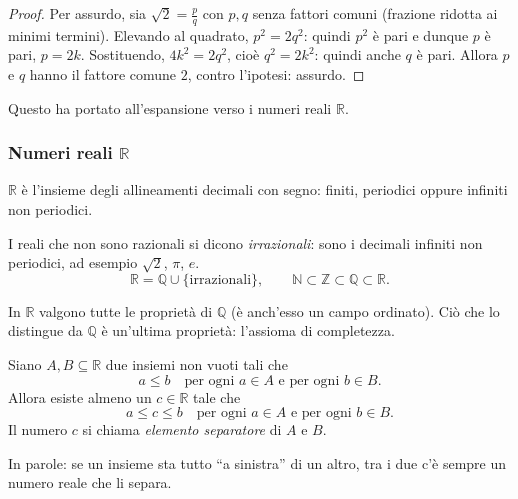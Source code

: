 \documentclass[11pt,a4paper]{article}
\begin{document}
\begin{proof}
Per assurdo, sia $\sqrt{2} = \frac{p}{q}$ con $p, q$ senza fattori comuni
(frazione ridotta ai minimi termini). Elevando al quadrato,
$p^2 = 2q^2$: quindi $p^2$ è pari e dunque $p$ è pari, $p = 2k$.
Sostituendo, $4k^2 = 2q^2$, cioè $q^2 = 2k^2$: quindi anche $q$ è pari.
Allora $p$ e $q$ hanno il fattore comune $2$, contro l'ipotesi: assurdo.
\end{proof}

Questo ha portato all'espansione verso i numeri reali $\mathbb{R}$.


\subsubsection{Numeri reali $\mathbb{R}$}

\begin{definizione}
$\mathbb{R}$ è l'insieme degli allineamenti decimali con segno:
finiti, periodici oppure infiniti non periodici.
\end{definizione}

I reali che non sono razionali si dicono \emph{irrazionali}: sono i
decimali infiniti non periodici, ad esempio $\sqrt{2}$, $\pi$, $e$.
\[
\mathbb{R} = \mathbb{Q} \cup \{\text{irrazionali}\}, \qquad
\mathbb{N} \subset \mathbb{Z} \subset \mathbb{Q} \subset \mathbb{R}.
\]

In $\mathbb{R}$ valgono tutte le proprietà di $\mathbb{Q}$ (è anch'esso un
campo ordinato). Ciò che lo distingue da $\mathbb{Q}$ è un'ultima
proprietà: l'assioma di completezza.

\begin{assioma}
Siano $A, B \subseteq \mathbb{R}$ due insiemi non vuoti tali che
\[
a \leq b \quad \text{per ogni } a \in A \text{ e per ogni } b \in B.
\]
Allora esiste almeno un $c \in \mathbb{R}$ tale che
\[
a \leq c \leq b \quad \text{per ogni } a \in A \text{ e per ogni } b \in B.
\]
Il numero $c$ si chiama \emph{elemento separatore} di $A$ e $B$.
\end{assioma}

In parole: se un insieme sta tutto ``a sinistra'' di un altro, tra i due
c'è sempre un numero reale che li separa.

\begin{center}
\end{center}
\end{document}
